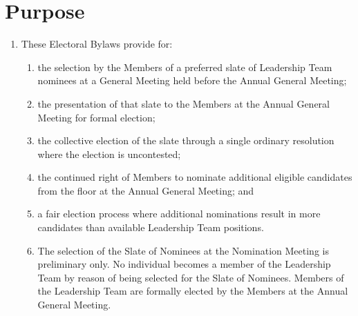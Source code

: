 \section{Purpose}
\label{purpose}

\begin{enumerate}
 \item These Electoral Bylaws provide for:
  \begin{enumerate}
   \item the selection by the Members of a preferred slate of Leadership Team nominees at a General Meeting held before the Annual General Meeting;
   \item the presentation of that slate to the Members at the Annual General Meeting for formal election;
   \item the collective election of the slate through a single ordinary resolution where the election is uncontested;
   \item the continued right of Members to nominate additional eligible candidates from the floor at the Annual General Meeting; and
   \item a fair election process where additional nominations result in more candidates than available Leadership Team positions.
   \item The selection of the Slate of Nominees at the Nomination Meeting is preliminary only. No individual becomes a member of the Leadership Team by reason of being selected for the Slate of Nominees. Members of the Leadership Team are formally elected by the Members at the Annual General Meeting.
  \end{enumerate}
\end{enumerate}
